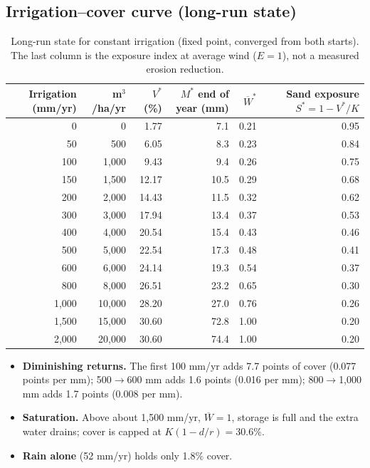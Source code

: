 \documentclass[11pt,a4paper]{article}
\newcommand{\Wb}{\overline W}
\begin{document}
\subsection{Irrigation--cover curve (long-run state)}
\begin{table}[H]\centering\small
\begin{tabular}{@{}rrrrrr@{}}
\toprule
Irrigation (mm/yr) & m$^3$/ha/yr & $V^*$ (\%) & $M^*$ end of year (mm) & $\Wb^*$ & Sand exposure $S^*=1-V^*/K$\\
\midrule
0 & 0 & 1.77 & 7.1 & 0.21 & 0.95\\
50 & 500 & 6.05 & 8.3 & 0.23 & 0.84\\
100 & 1,000 & 9.43 & 9.4 & 0.26 & 0.75\\
150 & 1,500 & 12.17 & 10.5 & 0.29 & 0.68\\
200 & 2,000 & 14.43 & 11.5 & 0.32 & 0.62\\
300 & 3,000 & 17.94 & 13.4 & 0.37 & 0.53\\
400 & 4,000 & 20.54 & 15.4 & 0.43 & 0.46\\
500 & 5,000 & 22.54 & 17.3 & 0.48 & 0.41\\
600 & 6,000 & 24.14 & 19.3 & 0.54 & 0.37\\
800 & 8,000 & 26.51 & 23.2 & 0.65 & 0.30\\
1,000 & 10,000 & 28.20 & 27.0 & 0.76 & 0.26\\
1,500 & 15,000 & 30.60 & 72.8 & 1.00 & 0.20\\
2,000 & 20,000 & 30.60 & 74.4 & 1.00 & 0.20\\
\bottomrule
\end{tabular}
\caption{Long-run state for constant irrigation (fixed point, converged from both starts). The last column is the exposure index at average wind ($E=1$), not a measured erosion reduction.}
\label{tab:curve}
\end{table}
\begin{itemize}
\item \textbf{Diminishing returns.} The first 100 mm/yr adds 7.7 points of cover (0.077 points per mm);
500$\to$600 mm adds 1.6 points (0.016 per mm); 800$\to$1,000 mm adds 1.7 points (0.008 per mm).
\item \textbf{Saturation.} Above about 1,500 mm/yr, $\Wb=1$, storage is full and the extra water drains; cover is capped at $K(1-d/r)=30.6\%$.
\item \textbf{Rain alone} (52 mm/yr) holds only 1.8\% cover.
\end{itemize}
\end{document}
